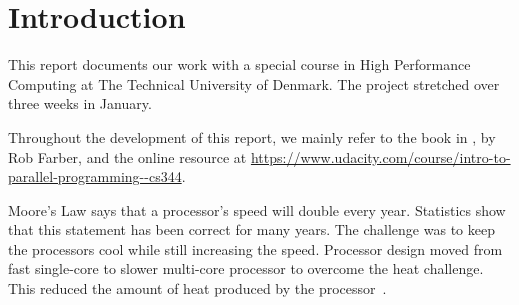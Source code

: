\chapter{Introduction}
\label{chap:introduction}

This report documents our work with a special course in High Performance Computing at The Technical University of Denmark.
The project stretched over three weeks in January.

Throughout the development of this report, we mainly refer to the book in \cite{farber2011cuda}, by Rob Farber, and the online resource at \url{https://www.udacity.com/course/intro-to-parallel-programming--cs344}.

Moore's Law says that a processor's speed will double every year.
Statistics show that this statement has been correct for many years.
The challenge was to keep the processors cool while still increasing the speed.
Processor design moved from fast single-core to slower multi-core processor to overcome the heat challenge.
This reduced the amount of heat produced by the processor~\cite{schaller1997moore,bryant2003computer}.



